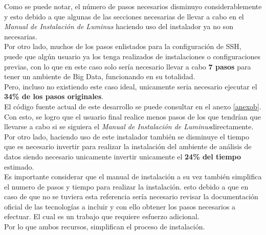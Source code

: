 Como se puede notar, el número de pasos necesarios disminuyo considerablemente y esto debido a que algunas de las secciones necesarias de llevar a cabo en el \emph{Manual de Instalación de Luminus} haciendo uso del instalador ya no son necesarias.
\\
Por otro lado, muchos de los pasos enlistados para la configuración de SSH, puede que algún usuario ya los tenga realizados de instalaciones o configuraciones previas, con lo que en este caso solo sería necesario llevar a cabo \textbf{7 pasos} para tener un ambiente de Big Data, funcionando en su totalidad.\\
Pero, incluso no existiendo este caso ideal, unicamente seria necesario ejecutar el \textbf{34\% de los pasos originales}. 
\\
El código fuente actual de este desarrollo se puede consultar en el anexo \ref{anexob}.
\\
Con esto, se logro que el usuario final realice menos pasos de los que tendrían que llevarse a cabo si se siguiera el \emph{Manual de Instalación de Luminus}directamente. 
\\
Por otro lado, haciendo uso de este instalador también se disminuye el tiempo que es necesario invertir para realizar la instalación del ambiente de análisis de datos siendo necesario unicamente invertir unicamente el \textbf{24\% del tiempo} estimado.\\
Es importante considerar que el manual de instalación a su vez también simplifica el numero de pasos y tiempo para realizar la instalación. esto debido a que en caso de que no se tuviera esta referencia sería necesario revisar la documentación oficial de las tecnologías a incluir y con ello obtener los pasos necesarios a efectuar. El cual es un trabajo que requiere esfuerzo adicional.\\
Por lo que ambos recursos, simplifican el proceso de instalación. \\

